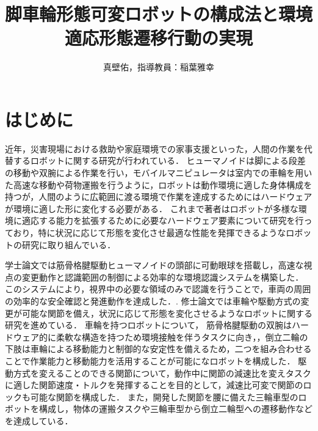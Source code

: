 \documentclass[twocolumn]{d-abst}
\title{脚車輪形態可変ロボットの構成法と環境適応形態遷移行動の実現}
\author{真壁佑，指導教員：稲葉雅幸}
\begin{document}
\pagestyle{empty}
\maketitle
\thispagestyle{empty}
\sloppy

\section{はじめに}
近年，災害現場における救助や家庭環境での家事支援といった，人間の作業を代替するロボットに関する研究が行われている．
ヒューマノイドは脚による段差の移動や双腕による作業を行い，モバイルマニピュレータは室内での車輪を用いた高速な移動や荷物運搬を行うように，ロボットは動作環境に適した身体構成を持つが，人間のように広範囲に渡る環境で作業を達成するためにはハードウェアが環境に適した形に変化する必要がある．
これまで著者はロボットが多様な環境に適応する能力を拡張するために必要なハードウェア要素について研究を行っており，特に状況に応じて形態を変化させ最適な性能を発揮できるようなロボットの研究に取り組んでいる．

学士論文では筋骨格腱駆動ヒューマノイドの頭部に可動眼球を搭載し，高速な視点の変更動作と認識範囲の制御による効率的な環境認識システムを構築した．
このシステムにより，視界中の必要な領域のみで認識を行うことで，車両の周囲の効率的な安全確認と発進動作を達成した\cite{makabe2018eye}．.
修士論文では車輪や駆動方式の変更が可能な関節を備え，状況に応じて形態を変化させるようなロボットに関する研究を進めている．
車輪を持つロボットについて，%
筋骨格腱駆動の双腕はハードウェア的に柔軟な構造を持つため環境接触を伴うタスクに向き，，倒立二輪の下肢は車輪による移動能力と制御的な安定性を備えるため，二つを組み合わせることで作業能力と移動能力を活用することが可能になロボットを構成した\cite{kawaharazuka2018twimp}．
駆動方式を変えることのできる関節について，動作中に関節の減速比を変えタスクに適した関節速度・トルクを発揮することを目的として，減速比可変で関節のロックも可能な関節を構成した．
また，開発した関節を腰に備えた三輪車型のロボットを構成し，物体の運搬タスクや三輪車型から倒立二輪型への遷移動作などを達成している\cite{makabe2019module}．
\end{document}
